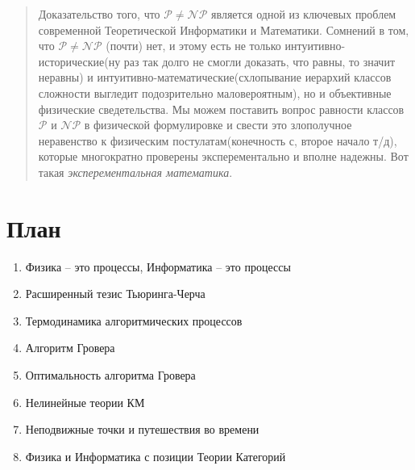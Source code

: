 \documentclass[a0,portrait]{a0poster}
\begin{document}

\begin{multicols}{2} %


\color{Navy} %

\begin{abstract}
Доказательство того, что $\mathcal{P}\neq\mathcal{NP}$ является одной из ключевых проблем современной Теоретической Информатики и Математики. Сомнений в том, что $\mathcal{P}\neq\mathcal{NP}$ (почти) нет, и этому есть не только интуитивно-исторические(ну раз так долго не смогли доказать, что равны, то значит неравны) и интуитивно-математические(схлопывание иерархий классов сложности выгледит подозрительно маловероятным), но и объективные физические сведетельства. Мы можем поставить вопрос равности классов $\mathcal{P}$ и $\mathcal{NP}$ в физической формулировке и свести это злополучное неравенство к физическим постулатам(конечность с, второе начало т/д), которые многократно проверены эксперементально и вполне надежны. Вот такая \textit{эксперементальная математика}.


\end{abstract}


\color{SaddleBrown} %

\section*{План}

\begin{enumerate}
\item Физика -- это процессы, Информатика -- это процессы
\item Расширенный тезис Тьюринга-Черча
\item Термодинамика алгоритмических процессов
\item Алгоритм Гровера
\item Оптимальность алгоритма Гровера
\item Нелинейные теории КМ
\item Неподвижные точки и путешествия во времени
\item Физика и Информатика с позиции Теории Категорий 
\end{enumerate}


\end{multicols}
\end{document}

